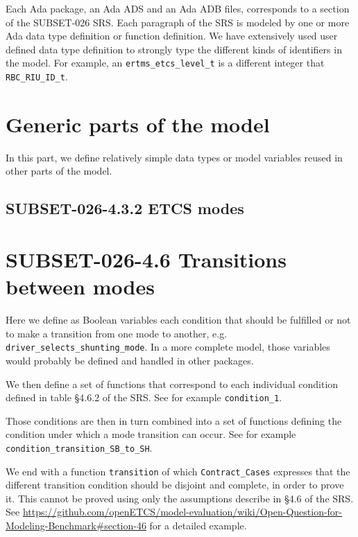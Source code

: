 \documentclass{template/openetcs_report}
\newcommand{\Ada}[1]{\lstinline[language=Ada,basicstyle={\sffamily},framesep=0pt]{#1}}
\begin{document}
Each Ada package, an Ada ADS and an Ada ADB files, corresponds to a
section of the SUBSET-026 SRS. Each paragraph of the SRS is modeled by
one or more Ada data type definition or function definition. We have
extensively used user defined data type definition to strongly type
the different kinds of identifiers in the model. For example, an
\Ada{ertms_etcs_level_t} is a different integer that
\Ada{RBC_RIU_ID_t}.


\section{Generic parts of the model}

In this part, we define relatively simple data types or model
variables reused in other parts of the model.






\subsection{SUBSET-026-4.3.2 ETCS modes}




\section{SUBSET-026-4.6 Transitions between modes}

Here we define as Boolean variables each condition that should be
fulfilled or not to make a transition from one mode to another,
e.g. \Ada{driver_selects_shunting_mode}. In a more complete model,
those variables would probably be defined and handled in other
packages.

We then define a set of functions that correspond to each individual
condition defined in table §4.6.2 of the SRS. See for example
\Ada{condition_1}.

Those conditions are then in turn combined into a set of functions
defining the condition under which a mode transition can occur. See
for example \Ada{condition_transition_SB_to_SH}.

We end with a function \Ada{transition} of which \Ada{Contract_Cases}
expresses that the different transition condition should be disjoint
and complete, in order to prove it. This cannot be proved using only
the assumptions describe in §4.6 of the SRS. See
\url{https://github.com/openETCS/model-evaluation/wiki/Open-Question-for-Modeling-Benchmark#section-46}
for a detailed example. 
\end{document}
